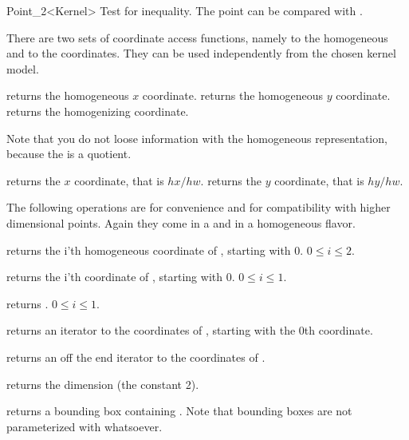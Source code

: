 \begin{ccRefClass} {Point_2<Kernel>}
       {Test for inequality. The point can be compared with .}

There are two sets of coordinate access functions, namely to the
homogeneous and to the  coordinates. They can be used
independently from the chosen kernel model.

       {returns the homogeneous $x$ coordinate.}
\ccGlue
{}
       {returns the homogeneous $y$ coordinate.}
\ccGlue
{}
       {returns the homogenizing  coordinate.}
       
Note that you do not loose information with the homogeneous
representation, because the  is a quotient.

       {returns the  $x$ coordinate, that is $hx/hw$.}
\ccGlue
{}
       {returns the  $y$ coordinate, that is $hy/hw$.}
       
The following operations are for convenience and for compatibility
with higher dimensional points. Again they come in a
 and in a homogeneous flavor.

       {returns the i'th homogeneous coordinate of \ccVar, starting with 0.
        \ccPrecond $0\leq i \leq 2$.}

       {returns the i'th  coordinate of \ccVar, starting with 0.
        \ccPrecond $0\leq i \leq 1$.}


       {returns .
        \ccPrecond $0\leq i \leq 1$.}

       {returns an iterator to the  coordinates 
        of \ccVar, starting with the 0th coordinate.}

       {returns an off the end iterator to the  
        coordinates of \ccVar.}

       {returns the dimension (the constant 2).}

       {returns a bounding box containing \ccVar. Note that bounding boxes
        are not parameterized with whatsoever. }


\end{ccRefClass}
